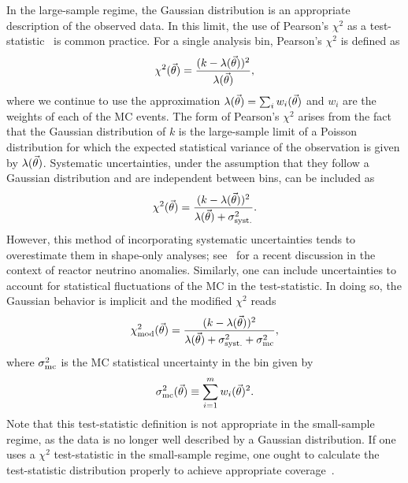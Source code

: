 In the large-sample regime, the Gaussian distribution is an appropriate description of the observed data.
In this limit, the use of Pearson's $\chi^2$ as a test-statistic~\cite{Pearson:1900} is common practice.
For a single analysis bin, Pearson's $\chi^2$ is defined as
\begin{equation}
\chi^2(\vec{\theta}) = \frac{(k - \lambda(\vec{\theta}))^2}{\lambda(\vec{\theta})},
\label{eq:chi2_pearson}
\end{equation}
where we continue to use the approximation $\lambda(\vec{\theta}) = \sum_i{w_i(\vec{\theta})}$ and $w_i$ are the weights of each of the MC events.
The form of Pearson's $\chi^2$ arises from the fact that the Gaussian distribution of $k$ is the large-sample limit of a Poisson distribution for which the expected statistical variance of the observation is given by $\lambda(\vec{\theta})$.
Systematic uncertainties, under the assumption that they follow a Gaussian distribution and are independent between bins, can be included as
\begin{equation}
\chi^2(\vec{\theta}) = \frac{(k - \lambda(\vec{\theta}))^2}{\lambda(\vec{\theta}) + \sigma^2_{\rm syst.}}.
\label{eq:chi2_systematics}
\end{equation}
However, this method of incorporating systematic uncertainties tends to overestimate them in shape-only analyses; see~\cite{Cogswell:2018auu} for a recent discussion in the context of reactor neutrino anomalies.
Similarly, one can include uncertainties to account for statistical fluctuations of the MC in the test-statistic.
In doing so, the Gaussian behavior is implicit and the modified $\chi^2$ reads
\begin{align}
\chi^2_{\rm mod}(\vec{\theta}) = \frac{(k - \lambda(\vec{\theta}))^2}{\lambda(\vec{\theta}) + \sigma^2_{\rm syst.} + \sigma^2_{\rm mc}},
\label{eq:modified_chi2}
\end{align}
where $\sigma^2_{\rm mc}$ is the MC statistical uncertainty in the bin given by
\begin{equation}\label{eq:sigma}
\sigma^2_{\rm mc}(\vec{\theta}) \equiv \sum_{i=1}^m w_i(\vec{\theta})^2.
\end{equation}
Note that this test-statistic definition is not appropriate in the small-sample regime, as the data is no longer well described by a Gaussian distribution.
If one uses a $\chi^2$ test-statistic in the small-sample regime, one ought to calculate the test-statistic distribution properly to achieve appropriate coverage~\cite{cowan1998statistical}.

